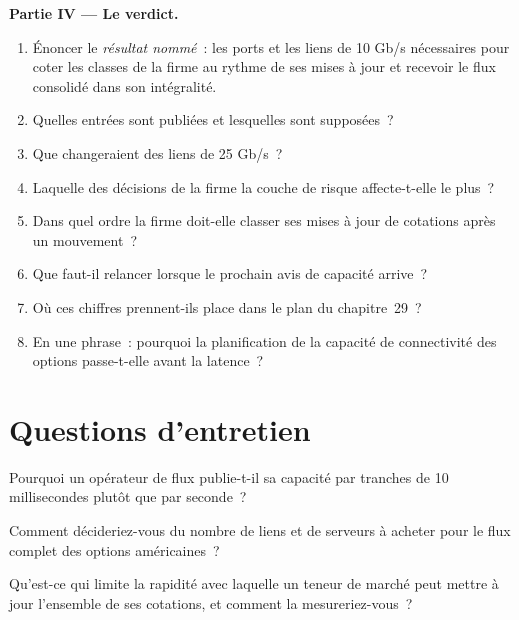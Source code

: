 \begin{problem}
\medskip\noindent\textbf{Partie IV --- Le verdict.}
\begin{enumerate}[resume]
\item Énoncer le \emph{résultat nommé}~: les ports et les liens de 10 Gb/s nécessaires pour coter les classes de la firme au rythme de ses mises à jour et
  recevoir le flux consolidé dans son intégralité.
\item Quelles entrées sont publiées et lesquelles sont supposées~?
\item Que changeraient des liens de 25 Gb/s~?
\item Laquelle des décisions de la firme la couche de risque affecte-t-elle le plus~?
\item Dans quel ordre la firme doit-elle classer ses mises à jour de cotations après un mouvement~?
\item Que faut-il relancer lorsque le prochain avis de capacité arrive~?
\item Où ces chiffres prennent-ils place dans le plan du chapitre~29~?
\item En une phrase~: pourquoi la planification de la capacité de connectivité des options passe-t-elle avant la latence~?
\end{enumerate}
\end{problem}

\section{Questions d'entretien}

\begin{interviewq}\label{iq:nw:equities-and-options-connectivity:1}
Pourquoi un opérateur de flux publie-t-il sa capacité par tranches de 10 millisecondes plutôt que par seconde~?
\end{interviewq}

\begin{interviewq}\label{iq:nw:equities-and-options-connectivity:2}
Comment décideriez-vous du nombre de liens et de serveurs à acheter pour le flux complet des options américaines~?
\end{interviewq}

\begin{interviewq}\label{iq:nw:equities-and-options-connectivity:3}
Qu'est-ce qui limite la rapidité avec laquelle un teneur de marché peut mettre à jour l'ensemble de ses cotations, et comment la mesureriez-vous~?
\end{interviewq}


